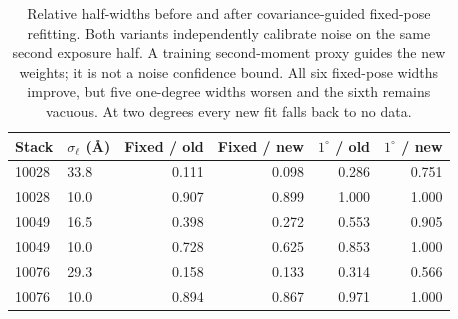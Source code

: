 \begin{table}[t]
\centering\small
\begin{tabular}{llrrrr}
\toprule
Stack & $\sigma_\ell$ (\AA) & Fixed / old & Fixed / new & $1^\circ$ / old & $1^\circ$ / new\\
\midrule
10028 & 33.8 & 0.111 & 0.098 & 0.286 & 0.751\\
10028 & 10.0 & 0.907 & 0.899 & 1.000 & 1.000\\
10049 & 16.5 & 0.398 & 0.272 & 0.553 & 0.905\\
10049 & 10.0 & 0.728 & 0.625 & 0.853 & 1.000\\
10076 & 29.3 & 0.158 & 0.133 & 0.314 & 0.566\\
10076 & 10.0 & 0.894 & 0.867 & 0.971 & 1.000\\
\bottomrule
\end{tabular}
\caption{Relative half-widths before and after covariance-guided fixed-pose refitting. Both variants independently calibrate noise on the same second exposure half. A training second-moment proxy guides the new weights; it is not a noise confidence bound. All six fixed-pose widths improve, but five one-degree widths worsen and the sixth remains vacuous. At two degrees every new fit falls back to no data.}
\label{tab:noisemetric}
\end{table}
